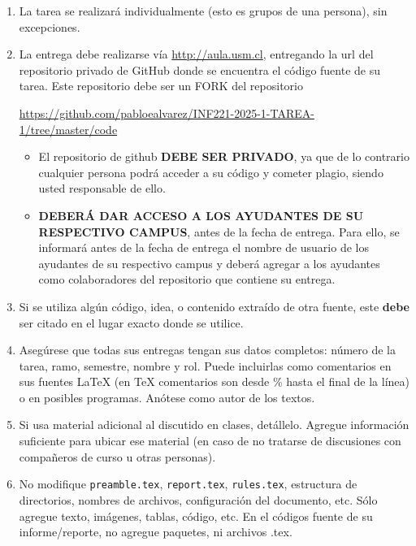 
  \begin{enumerate}[(1)]
  \item
    La tarea se realizará individualmente
    (esto es grupos de una persona),
    sin excepciones.
  \item
    La entrega debe realizarse vía \url{http://aula.usm.cl}, entregando la url del repositorio privado de GitHub donde se encuentra el código fuente de su tarea. Este repositorio debe ser un FORK del repositorio 
    \begin{center}

      \url{https://github.com/pabloealvarez/INF221-2025-1-TAREA-1/tree/master/code}
          
  \end{center}

  \begin{itemize}
      
  \item El repositorio de github \textbf{DEBE SER PRIVADO}, ya que de lo contrario cualquier persona podrá acceder a su código y cometer plagio, siendo usted responsable de ello.
  \item  \textbf{DEBERÁ DAR ACCESO A LOS AYUDANTES DE SU RESPECTIVO CAMPUS}, antes de la fecha de entrega. Para ello, se informará antes de la fecha de entrega el nombre de usuario de los ayudantes de su respectivo campus y deberá agregar a los ayudantes como colaboradores del repositorio que contiene su entrega. 
  \end{itemize}

  \item Si se utiliza algún código, idea, o contenido extraído de otra fuente, este \textbf{debe} ser citado en el lugar exacto donde se utilice. 
  \item
  Asegúrese que todas sus entregas tengan sus datos completos:
  número de la tarea, ramo, semestre, nombre y rol.
  Puede incluirlas como comentarios en sus fuentes \LaTeX{}
  (en \TeX{} comentarios son desde \% hasta el final de la línea)
  o en posibles programas.
  Anótese como autor de los textos.

  \item
    Si usa material adicional al discutido en clases,
    detállelo.
    Agregue información suficiente para ubicar ese material
    (en caso de no tratarse de discusiones con compañeros de curso
     u otras personas).
    \item No modifique \texttt{preamble.tex}, \texttt{report.tex}, \texttt{rules.tex}, estructura de directorios, nombres de archivos, configuración del documento, etc. Sólo agregue texto, imágenes, tablas, código, etc. En el códigos fuente de su informe/reporte, no agregue paquetes, ni archivos .tex.


\end{enumerate}
